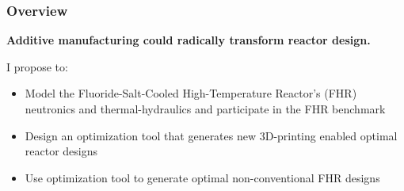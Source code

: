 \begin{frame}
    \frametitle{Overview}
    \textbf{Additive manufacturing could radically transform reactor design.}
    \vspace{0.5cm}

    I propose to: 
    \begin{itemize}
        \item Model the Fluoride-Salt-Cooled High-Temperature Reactor's (FHR)
        neutronics and thermal-hydraulics and participate in the FHR benchmark
        \item Design an optimization tool that generates new 3D-printing enabled 
        optimal reactor designs
        \item Use optimization tool to generate optimal non-conventional 
        FHR designs
    \end{itemize}
\end{frame}